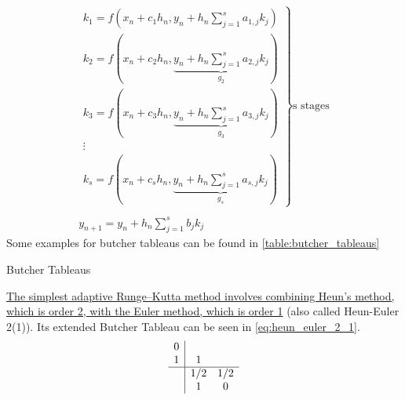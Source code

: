 \begin{equation}\label{eq:general_runge_kutta}
\begin{array}{l}
\left.\begin{array}{l}
k_1=f\left(x_n+c_1 h_n, y_n+h_n \sum_{j=1}^s a_{1, j} k_j\right) \\
k_2=f(x_n+c_2 h_n, \underbrace{y_n+h_n \sum_{j=1}^s a_{2, j} k_j}_{g_2}) \\
k_3=f(x_n+c_3 h_n, \underbrace{y_n+h_n \sum_{j=1}^s a_{3, j} k_j}_{g_3}) \\
\vdots \\
k_s=f(x_n+c_s h_n, \underbrace{y_n+h_n \sum_{j=1}^s a_{s, j} k_j}_{g_s})
\end{array}\right\} \text{s stages}\\ \\
y_{n+1}=y_n+h_n \sum_{j=1}^s b_j k_j
\end{array}
\end{equation}
Some examples for butcher tableaus can be found in \autoref{table:butcher_tableaus}
\begin{table}[ht]
  \centering
  \caption{Butcher Tableaus}
  \label{table:butcher_tableaus}
\end{table}\newline
\href{https://en.wikipedia.org/wiki/List_of_Runge%E2%80%93Kutta_methods}{The simplest adaptive Runge–Kutta method involves combining Heun's method, which is order 2, with the Euler method, which is order 1} (also called Heun-Euler 2(1)). Its extended Butcher Tableau can be seen in \autoref{eq:heun_euler_2_1}. 
\begin{equation}\label{eq:heun_euler_2_1}
\begin{array}{c|cc}
0 & & \\
1 & 1 & \\
\hline & 1 / 2 & 1 / 2 \\
& 1 & 0
\end{array}
\end{equation}

